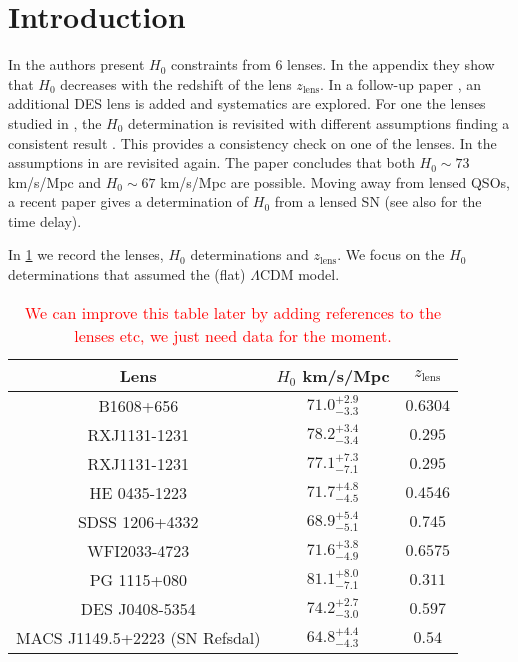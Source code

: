 \documentclass[aps,prl,10pt,twocolumn,superscriptaddress]{revtex4}
\def\red{\textcolor{red}}
\begin{document}
\section{Introduction} 
In \cite{Wong:2019kwg} the authors present $H_0$ constraints from 6 lenses. In the appendix they show that $H_0$ decreases with the redshift of the lens $z_{\textrm{lens}}$. In a follow-up paper \cite{Millon:2019slk}, an additional DES lens \cite{DES:2019fny} is added and systematics are explored. For one the lenses studied in \cite{Wong:2019kwg}, the $H_0$ determination is revisited with different assumptions finding a consistent result \cite{Shajib:2023uig}. This provides a consistency check on one of the lenses. In \cite{Birrer:2020tax} the assumptions in \cite{Wong:2019kwg} are revisited again. The paper concludes that both $H_0 \sim 73$ km/s/Mpc and $H_0 \sim 67$ km/s/Mpc are possible. Moving away from lensed QSOs, a recent paper gives a determination of $H_0$ from a lensed SN \cite{Kelly:2023mgv} (see also \cite{Kelly:2023wzm} for the time delay). 

In \ref{tab:lenses} we record the lenses, $H_0$ determinations and $z_{\textrm{lens}}$. We focus on the $H_0$ determinations that assumed the (flat) $\Lambda$CDM model. 

\begin{table}[htb]
\centering
\begin{tabular}{ccc}
Lens & $H_0$ km/s/Mpc & $z_{\textrm{lens}}$ \\
\hline
\rule{0pt}{3ex} B1608+656 \cite{} &  $71.0^{+2.9}_{-3.3}$ \cite{Wong:2019kwg} & $0.6304$ \\ 
\rule{0pt}{3ex} RXJ1131-1231 \cite{} & $78.2^{+3.4}_{-3.4}$ \cite{Wong:2019kwg} & $0.295$ \\ 
\rule{0pt}{3ex} RXJ1131-1231 \cite{} & $77.1^{+7.3}_{-7.1}$ \cite{Shajib:2023uig} & $0.295$ \\ 
\rule{0pt}{3ex} HE 0435-1223 \cite{} &  $71.7^{+4.8}_{-4.5}$ \cite{Wong:2019kwg}& $0.4546$ \\
\rule{0pt}{3ex} SDSS 1206+4332 \cite{} &  $68.9^{+5.4}_{-5.1}$ \cite{Wong:2019kwg}& $0.745$  \\ 
\rule{0pt}{3ex} WFI2033-4723 \cite{} &  $71.6^{+3.8}_{-4.9}$ \cite{Wong:2019kwg} & $0.6575$ \\ 
\rule{0pt}{3ex} PG 1115+080 \cite{} & $81.1^{+8.0}_{-7.1}$ \cite{Wong:2019kwg} & $0.311$  \\
\rule{0pt}{3ex} DES J0408-5354 \cite{DES:2017lgx} & $74.2^{+2.7}_{-3.0}$ \cite{DES:2019fny} & $0.597$  \\
\rule{0pt}{3ex} MACS J1149.5+2223 (SN Refsdal) \cite{} & $64.8^{+4.4}_{-4.3}$ \cite{Kelly:2023mgv} & $0.54$  \\
\end{tabular}
\caption{\red{We can improve this table later by adding references to the lenses etc, we just need data for the moment.}}
\label{tab:lenses}
\end{table}
\end{document}
